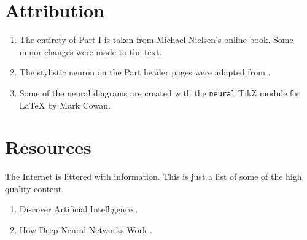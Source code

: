 \section*{Attribution}

\begin{enumerate}
\item 
The entirety of Part I is taken from Michael Nielsen's online book\cite{Nielsen2015}. Some minor changes were made to the text.

\item
The stylistic neuron on the Part header pages were adapted from \cite{Erler2004}. 

\item
Some of the neural diagrams  are created with the \lstinline{neural} TikZ module for \LaTeX{}\cite{cowan2019} by Mark Cowan.
\end{enumerate}

\section*{Resources}

The Internet is littered with information.  This is just a list of some of the high quality content.

\begin{enumerate}
\item Discover Artificial Intelligence \cite{AnkitGupta2019}.
\item How Deep Neural Networks Work  \cite{BrandonRohrer2019}.
\end{enumerate} 